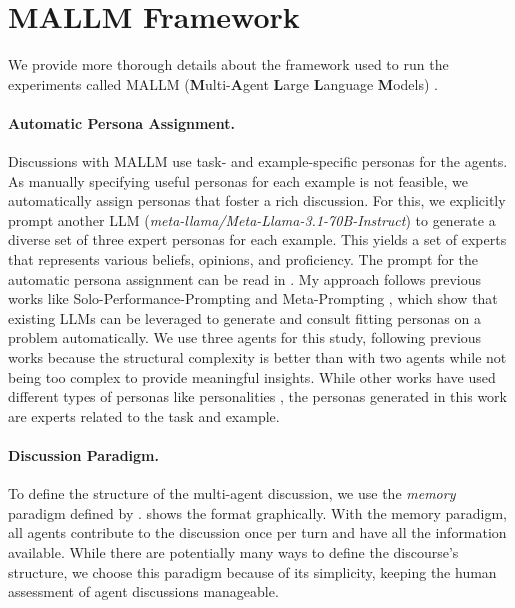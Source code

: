 \section{MALLM Framework} \label{app:framework}

We provide more thorough details about the framework used to run the experiments called MALLM (\textbf{M}ulti-\textbf{A}gent \textbf{L}arge \textbf{L}anguage \textbf{M}odels) \citep{becker2025mallmmultiagentlargelanguage}.

\paragraph{\textbf{Automatic Persona Assignment.}}
Discussions with MALLM use task- and example-specific personas for the agents.
As manually specifying useful personas for each example is not feasible, we automatically assign personas that foster a rich discussion.
For this, we explicitly prompt another LLM (\textit{meta-llama/Meta-Llama-3.1-70B-Instruct}) to generate a diverse set of three expert personas for each example.
This yields a set of experts that represents various beliefs, opinions, and proficiency.
The prompt for the automatic persona assignment can be read in .
My approach follows previous works like Solo-Performance-Prompting \citep{WangMWG23a} and Meta-Prompting \citep{SuzgunK24a}, which show that existing LLMs can be leveraged to generate and consult fitting personas on a problem automatically.
We use three agents for this study, following previous works \citep{ChenSB24a, YinSCG23a} because the structural complexity is better than with two agents while not being too complex to provide meaningful insights.
While other works have used different types of personas like personalities \citep{ShiZWW23a}, the personas generated in this work are experts related to the task and example.

\paragraph{\textbf{Discussion Paradigm.}}
To define the structure of the multi-agent discussion, we use the \textit{memory} paradigm defined by \citet{YinSCG23a}.
 shows the format graphically.
With the memory paradigm, all agents contribute to the discussion once per turn and have all the information available.
While there are potentially many ways to define the discourse's structure, we choose this paradigm because of its simplicity, keeping the human assessment of agent discussions manageable.

